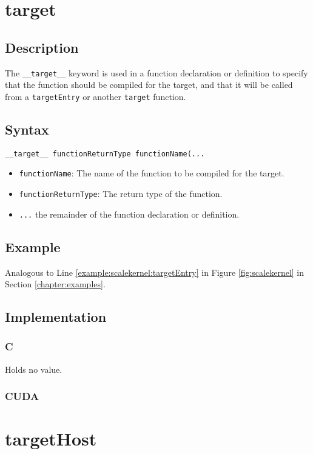 \newpage
\section{target}
\subsection{Description}

The \verb+__target__+ keyword is used in a function declaration
or definition to specify that the function should be compiled for the
target, and that it will be called from a \verb+targetEntry+ or another \verb+target+ function.

\subsection{Syntax}
\begin{verbatim}
__target__ functionReturnType functionName(...
\end{verbatim}

\begin{itemize}
\item \verb+functionName+: The name of the function to be compiled for the target.
\item \verb+functionReturnType+: The return type of the function.
\item \verb+...+ the remainder of the function declaration or definition.
\end{itemize}


\subsection{Example}
Analogous to Line \ref{example:scalekernel:targetEntry} in Figure \ref{fig:scalekernel} in Section \ref{chapter:examples}.

\subsection{Implementation}
\subsubsection{C}
Holds no value.
\subsubsection{CUDA}



\newpage
\section{targetHost}
